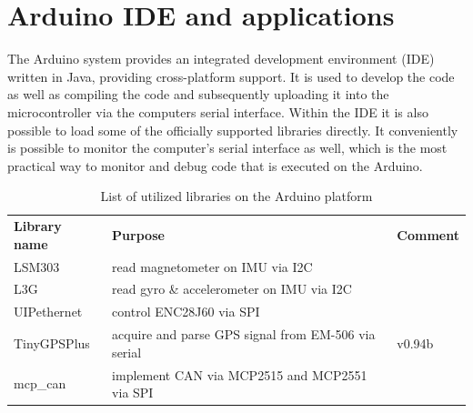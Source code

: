 \documentclass[ExampleMasters.tex]{subfiles}
\begin{document}
\section{Arduino IDE and applications}
\label{sec:arduino_applications}

The Arduino system provides an integrated development environment (IDE)  written in Java, providing cross-platform support. It is used to develop the code as well as compiling the code and subsequently uploading it into the microcontroller via the computers serial interface. Within the IDE it is also possible to load some of the officially supported libraries directly. It conveniently is possible to monitor the computer's serial interface as well, which is the most practical way to monitor and debug code that is executed on the Arduino. 

\begin{table}[h]
	\label{tab:list_of_arduino_libs}
	\begin{tabular}{lll}
		\textbf{Library name} & \textbf{Purpose}                                    & \textbf{Comment} \\
		LSM303                & read magnetometer on IMU via I2C                    &                \cite{lsm303_github}  \\
		L3G                   & read gyro \& accelerometer on IMU via I2C           &      
		\cite{l3g_github}            \\
		UIPethernet           &     control ENC28J60 via SPI                                                &             \cite{uip_ethernet_github}     \\
		TinyGPSPlus           & acquire and parse GPS signal from EM-506 via serial & v0.94b\cite{tiny_gps_plus_github}     \\
		mcp\_can & implement CAN via MCP2515 and MCP2551 via SPI     & \cite{mcp_can_github}
	\end{tabular}
	
	\caption{List of utilized libraries on the Arduino platform}
\end{table}
\end{document}
